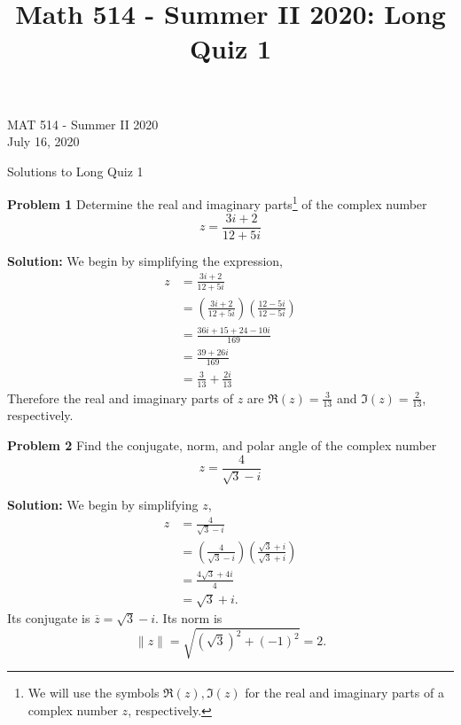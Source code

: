 \documentclass[12pt,oneside]{exam}
\title{Math 514 - Summer II 2020: Long Quiz 1}
\newenvironment{exercise}[1]{\vspace{.1in}\noindent\textbf{Problem #1 \hspace{.05em}}}{}
\begin{document}
\begin{flushright}
\sc MAT 514 - Summer II 2020\\
July 16, 2020
\end{flushright}
\bigskip
 
\begin{center}
\textsf{Solutions to Long Quiz 1} 
\end{center}


\begin{exercise}{1}
Determine the real and imaginary parts\footnote{We will use the symbols $\Re(z), \Im(z)$ for the real and imaginary parts of a complex number $z$, respectively.} of the complex number 
\begin{equation*}
z = \frac{3i+2}{12+5i}
\end{equation*}
\end{exercise}

\textbf{Solution:} We begin by simplifying the expression, 
\begin{align*}
z & = \frac{3i+2}{12+5i} \\
& = \left(\frac{3i+2}{12+5i}\right)\left(\frac{12-5i}{12-5i}\right) \\
& = \frac{36i+15+24-10i}{169}\\
& = \frac{39+26i}{169}\\
& = \frac{3}{13} + \frac{2i}{13}
\end{align*}
Therefore the real and imaginary parts of $z$ are $\Re(z)=\frac{3}{13}$ and $\Im(z)=\frac{2}{13}$, respectively. 

\vfill
\begin{exercise}{2}
Find the conjugate, norm, and polar angle of the complex number
\begin{equation*}
z = \frac{4}{\sqrt{3}-i}
\end{equation*}
\end{exercise}

\textbf{Solution:} We begin by simplifying $z$, 
\begin{align*}
z & = \frac{4}{\sqrt{3}-i}\\
& = \left(\frac{4}{\sqrt{3}-i}\right)\left(\frac{\sqrt{3}+i}{\sqrt{3}+i}\right)\\
& = \frac{4\sqrt{3}+4i}{4}\\
& = \sqrt{3}+i.
\end{align*}
Its conjugate is $\overline{z} = \sqrt{3}-i$. Its norm is
\begin{equation*}
\|z\| = \sqrt{(\sqrt{3})^2 +(-1)^2} = 2. 
\end{equation*}
\end{document}
